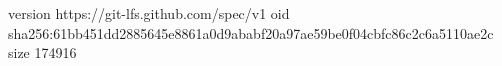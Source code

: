 version https://git-lfs.github.com/spec/v1
oid sha256:61bb451dd2885645e8861a0d9ababf20a97ae59be0f04cbfc86c2c6a5110ae2c
size 174916

